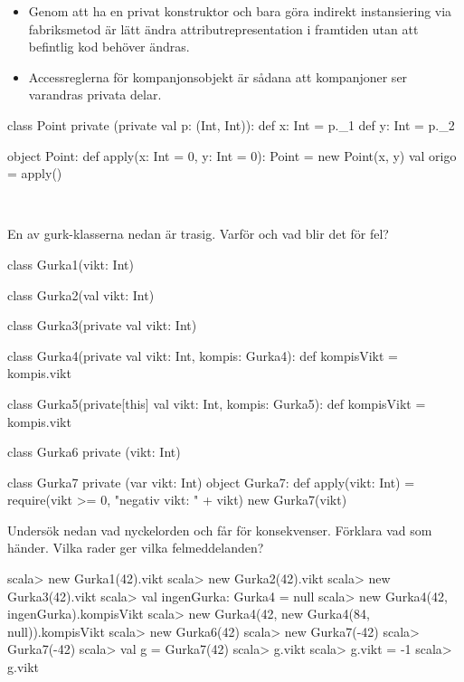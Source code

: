 \SubtaskSolved
\begin{itemize}
  \item Genom att ha en privat konstruktor och bara göra indirekt instansiering via fabriksmetod är lätt ändra attributrepresentation i framtiden utan att befintlig kod behöver ändras.

  \item Accessreglerna för kompanjonsobjekt är sådana att kompanjoner ser varandras privata delar.
\end{itemize}

\SubtaskSolved

\begin{Code}
class Point private (private val p: (Int, Int)):
  def x: Int = p._1
  def y: Int = p._2

object Point:
  def apply(x: Int = 0, y: Int = 0): Point = new Point(x, y)
  val origo = apply()
\end{Code}

\QUESTEND




\QUESTBEGIN

\Task  \what~

\Subtask En av gurk-klasserna nedan är trasig. Varför och vad blir det för fel?

\begin{Code}
class Gurka1(vikt: Int)

class Gurka2(val vikt: Int)

class Gurka3(private val vikt: Int)

class Gurka4(private val vikt: Int, kompis: Gurka4):
  def kompisVikt = kompis.vikt

class Gurka5(private[this] val vikt: Int, kompis: Gurka5):
  def kompisVikt = kompis.vikt

class Gurka6 private (vikt: Int)

class Gurka7 private (var vikt: Int)
object Gurka7:
  def apply(vikt: Int) =
    require(vikt >= 0, "negativ vikt: " + vikt)
    new Gurka7(vikt)
\end{Code}

\Subtask Undersök nedan vad nyckelorden  och  får för konsekvenser. Förklara vad som händer. Vilka rader ger vilka felmeddelanden?

\begin{REPL}
scala> new Gurka1(42).vikt
scala> new Gurka2(42).vikt
scala> new Gurka3(42).vikt
scala> val ingenGurka: Gurka4 = null
scala> new Gurka4(42, ingenGurka).kompisVikt
scala> new Gurka4(42, new Gurka4(84, null)).kompisVikt
scala> new Gurka6(42)
scala> new Gurka7(-42)
scala> Gurka7(-42)
scala> val g = Gurka7(42)
scala> g.vikt
scala> g.vikt = -1
scala> g.vikt
\end{REPL}


